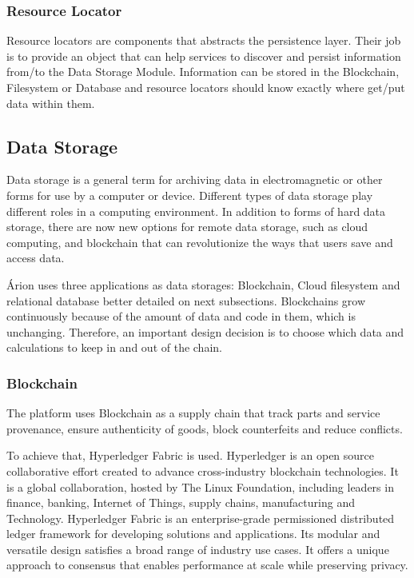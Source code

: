 \subsubsection{Resource Locator}\label{sec:ResourceLocator}

Resource locators are components that abstracts the persistence layer. Their job is to provide an object that can help services to discover and persist information from/to the Data Storage Module. Information can be stored in the Blockchain, Filesystem or Database and resource locators should know exactly where get/put data within them.

\subsection{Data Storage}\label{sec:DataStorage}
Data storage is a general term for archiving data in electromagnetic or other forms for use by a computer or device. Different types of data storage play different roles in a computing environment. In addition to forms of hard data storage, there are now new options for remote data storage, such as cloud computing, and blockchain that can revolutionize the ways that users save and access data.  

Árion uses three applications as data storages: Blockchain, Cloud filesystem and relational database better detailed on next subsections. Blockchains grow continuously because of the amount of data and code in them, which is unchanging. Therefore, an important design decision is to choose which data and calculations to keep in and out of the chain.

\subsubsection{Blockchain}\label{sec:DataStorageBlockchain}
The platform uses Blockchain as a supply chain that track parts and service provenance, ensure authenticity of goods, block counterfeits and reduce conflicts.

To achieve that, Hyperledger Fabric is used. Hyperledger is an open source collaborative effort created to advance cross-industry blockchain technologies. It is a global collaboration, hosted by The Linux Foundation, including leaders in finance, banking, Internet of Things, supply chains, manufacturing and Technology.
Hyperledger Fabric is an enterprise-grade permissioned distributed ledger framework for developing solutions and applications. Its modular and versatile design satisfies a broad range of industry use cases. It offers a unique approach to consensus that enables performance at scale while preserving privacy.

